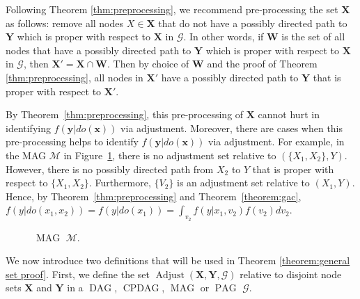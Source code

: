 \documentclass[11pt,a4paper]{article}
\DeclareMathOperator{\CPDAG}{CPDAG}
\DeclareMathOperator{\DAG}{DAG}
\DeclareMathOperator{\MAG}{MAG}
\DeclareMathOperator{\PAG}{PAG}
\DeclareMathOperator{\Adjust}{Adjust}
\newcommand{\g}[1][G]{\mathcal{#1}}
\newcommand{\adjustb}[2][X,Y]{\Adjust(\mathbf{#1},#2)}
\begin{document}
\noindent{}Following Theorem \ref{thm:preprocessing}, we  recommend pre-processing the set $\mathbf{X}$ as follows: remove all nodes $X \in \mathbf{X}$ that do not have a possibly directed path to $\mathbf{Y}$ which is proper with respect to $\mathbf{X}$ in $\g$. In other words, if $\mathbf{W}$ is the set of all nodes that have a possibly directed path to $\mathbf{Y}$ which is proper with respect to $\mathbf{X}$ in $\g$, then $\mathbf{X'} =  \mathbf{X} \cap \mathbf{W}$. Then by choice of $\mathbf{W}$ and the proof of Theorem \ref{thm:preprocessing}, all nodes in $\mathbf{X'}$ have a possibly directed path to $\mathbf{Y}$ that is proper with respect to $\mathbf{X'}$.

By Theorem~\ref{thm:preprocessing}, this pre-processing of $\mathbf{X}$ cannot hurt in identifying $f(\mathbf{y}|do(\mathbf{x}))$ via adjustment. 
Moreover, there are cases when this pre-processing helps to identify  $f(\mathbf{y}|do(\mathbf{x}))$ via adjustment. For example, in the MAG $\g[M]$ in Figure~\ref{fig:magnoset}, there is no adjustment set relative to $(\{X_1,X_2\}, Y)$. However, there is no possibly directed path from $X_2$ to $Y$ that is proper with respect to $\{X_1,X_2\}$. Furthermore, $\{V_2\}$ is an adjustment set relative to $(X_1,Y)$. Hence, by Theorem~\ref{thm:preprocessing} and Theorem~\ref{theorem:gac}, $f(y|do(x_1,x_2)) = f(y|do(x_1)) = \int_{v_2} f(y|x_1,v_2)f(v_2)dv_2$.



\begin{figure}
     \centering
   \caption{ $\MAG$ $\g[M]$.}
   \label{fig:magnoset}
\end{figure}

We now introduce two definitions that will be used in Theorem \ref{theorem:general set proof}. First, we define the set $\adjustb{\g}$ relative to disjoint node sets $\mathbf{X}$ and $\mathbf{Y}$ in a $\DAG$, $\CPDAG$, $\MAG$ or $\PAG$ $\g$.
\end{document}
